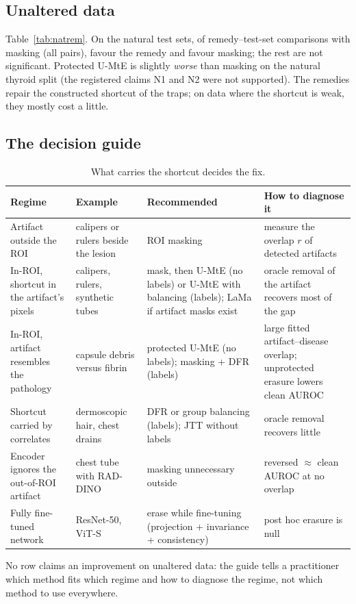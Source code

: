 \subsection{Unaltered data}
Table~\ref{tab:natrem}. On the natural test sets, of \sSixNatRemN{} remedy--test-set comparisons with masking (all pairs),
\sSixNatRemPos{} favour the remedy and \sSixNatRemNeg{} favour masking; the rest are not significant. Protected U-MtE is
slightly \emph{worse} than masking on the natural thyroid split (the registered claims N1 and N2 were not supported). The
remedies repair the constructed shortcut of the traps; on data where the shortcut is weak, they mostly cost a little.


\subsection{The decision guide}
\begin{table}[H]\centering\scriptsize
\caption{What carries the shortcut decides the fix.}\label{tab:guide}
\begin{tabular}{p{3.4cm}p{3.4cm}p{4.4cm}p{3.8cm}}\toprule
Regime & Example & Recommended & How to diagnose it \\\midrule
Artifact outside the ROI & calipers or rulers beside the lesion & ROI masking & measure the overlap $r$ of detected artifacts \\
In-ROI, shortcut in the artifact's pixels & calipers, rulers, synthetic tubes & mask, then U-MtE (no labels) or U-MtE with balancing (labels); LaMa if artifact masks exist & oracle removal of the artifact recovers most of the gap \\
In-ROI, artifact resembles the pathology & capsule debris versus fibrin & protected U-MtE (no labels); masking + DFR (labels) & large fitted artifact--disease overlap; unprotected erasure lowers clean AUROC \\
Shortcut carried by correlates & dermoscopic hair, chest drains & DFR or group balancing (labels); JTT without labels & oracle removal recovers little \\
Encoder ignores the out-of-ROI artifact & chest tube with RAD-DINO & masking unnecessary outside & reversed $\approx$ clean AUROC at no overlap \\
Fully fine-tuned network & ResNet-50, ViT-S & erase while fine-tuning (projection + invariance + consistency) & post hoc erasure is null \\
\bottomrule\end{tabular}\end{table}
No row claims an improvement on unaltered data: the guide tells a practitioner which method fits which regime and how to
diagnose the regime, not which method to use everywhere.

